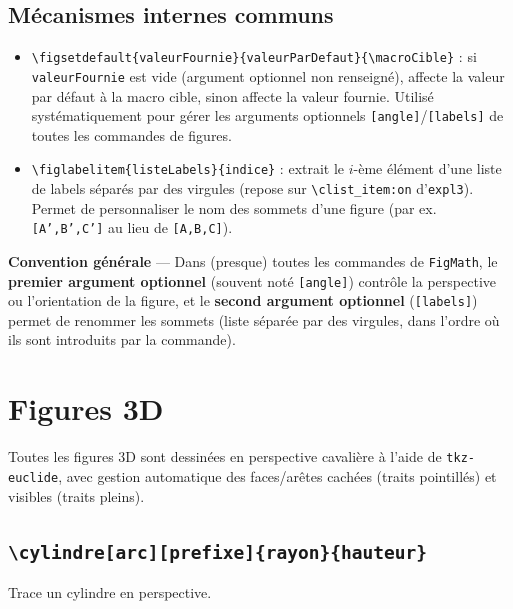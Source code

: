 \documentclass[11pt,a4paper]{article}
\newcommand{\pkg}[1]{\texttt{#1}}
\newcommand{\cmdname}[1]{\texttt{\textbackslash#1}}
\begin{document}
\subsection{Mécanismes internes communs}

\begin{itemize}
  \item \cmdname{figsetdefault\{valeurFournie\}\{valeurParDefaut\}\{\textbackslash macroCible\}} : si \texttt{valeurFournie} est vide (argument optionnel non renseigné), affecte la valeur par défaut à la macro cible, sinon affecte la valeur fournie. Utilisé systématiquement pour gérer les arguments optionnels \texttt{[angle]}/\texttt{[labels]} de toutes les commandes de figures.
  \item \cmdname{figlabelitem\{listeLabels\}\{indice\}} : extrait le $i$-ème élément d'une liste de labels séparés par des virgules (repose sur \texttt{\textbackslash clist\_item:on} d'\pkg{expl3}). Permet de personnaliser le nom des sommets d'une figure (par ex. \texttt{[A',B',C']} au lieu de \texttt{[A,B,C]}).
\end{itemize}

\begin{noteFig}
\textbf{Convention générale} — Dans (presque) toutes les commandes de \pkg{FigMath}, le \textbf{premier argument optionnel} (souvent noté \texttt{[angle]}) contrôle la perspective ou l'orientation de la figure, et le \textbf{second argument optionnel} (\texttt{[labels]}) permet de renommer les sommets (liste séparée par des virgules, dans l'ordre où ils sont introduits par la commande).
\end{noteFig}

\section{Figures 3D}

Toutes les figures 3D sont dessinées en perspective cavalière à l'aide de \pkg{tkz-euclide}, avec gestion automatique des faces/arêtes cachées (traits pointillés) et visibles (traits pleins).

\subsection{\cmdname{cylindre[arc][prefixe]\{rayon\}\{hauteur\}}}

Trace un cylindre en perspective.
\end{document}

